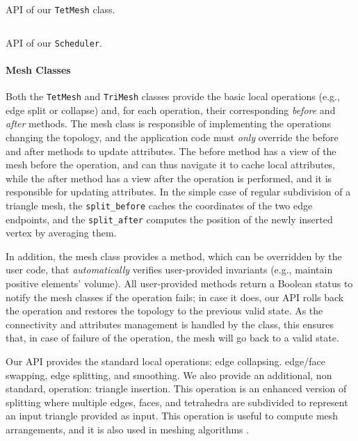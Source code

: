 \begin{algorithm}
\inputminted{cpp}{wmtk-tex/code/tetmesh.cpp}
\caption{API of our \texttt{TetMesh} class.}
\label{algo:tetmesh}
\end{algorithm}



\begin{algorithm}
\inputminted{cpp}{wmtk-tex/code/scheduler.cpp}
\caption{API of our \texttt{Scheduler}.}
\label{algo:scheduler}
\end{algorithm}

\paragraph{Mesh Classes}
Both the \texttt{TetMesh} and \texttt{TriMesh} classes provide the basic local operations (e.g., edge split or collapse) and, for each operation, their corresponding \emph{before} and \emph{after} methods. The mesh class is responsible of implementing the operations changing the topology, and the application code must \emph{only} override the before and after methods to update attributes. The before method has a view of the mesh before the operation, and can thus navigate it to cache local attributes, while the after method has a view after the operation is performed, and it is responsible for updating attributes. In the simple case of regular subdivision of a triangle mesh, the \texttt{split\_before} caches the coordinates of the two edge endpoints, and the \texttt{split\_after} computes the position of the newly inserted vertex by averaging them. 

In addition, the mesh class provides a method, which can be overridden by the user code, that \emph{automatically} verifies user-provided invariants (e.g., maintain positive elements' volume). All user-provided methods return a Boolean status to notify the mesh classes if the operation fails; in case it does, our API rolls back the operation and restores the topology to the previous valid state. As the connectivity and attributes management is handled by the class, this ensures that, in case of failure of the operation, the mesh will go back to a valid state.

Our API provides the standard local operations: edge collapsing. edge/face swapping, edge splitting, and smoothing. We also provide an additional, non standard, operation: triangle insertion. This operation is an enhanced version of splitting where multiple edges, faces, and tetrahedra are subdivided to represent an input  triangle provided as input. This operation is useful to compute mesh arrangements, and it is also used in meshing algorithms \cite{Hu:2019:fTetWild}.

